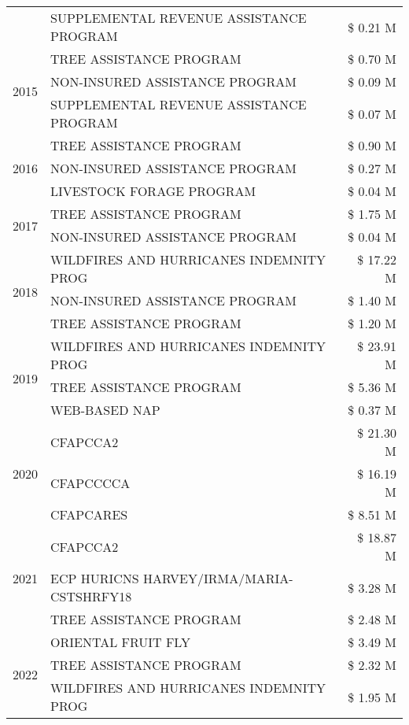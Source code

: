 \begin{tabular}{llr}
 & SUPPLEMENTAL REVENUE ASSISTANCE PROGRAM & \$ 0.21 M \\
\cline{1-3}
\multirow[t]{3}{*}{2015} & TREE ASSISTANCE PROGRAM & \$ 0.70 M \\
 & NON-INSURED ASSISTANCE PROGRAM & \$ 0.09 M \\
 & SUPPLEMENTAL REVENUE ASSISTANCE PROGRAM & \$ 0.07 M \\
\cline{1-3}
\multirow[t]{3}{*}{2016} & TREE ASSISTANCE PROGRAM & \$ 0.90 M \\
 & NON-INSURED ASSISTANCE PROGRAM & \$ 0.27 M \\
 & LIVESTOCK FORAGE PROGRAM & \$ 0.04 M \\
\cline{1-3}
\multirow[t]{2}{*}{2017} & TREE ASSISTANCE PROGRAM & \$ 1.75 M \\
 & NON-INSURED ASSISTANCE PROGRAM & \$ 0.04 M \\
\cline{1-3}
\multirow[t]{3}{*}{2018} & WILDFIRES AND HURRICANES INDEMNITY PROG & \$ 17.22 M \\
 & NON-INSURED ASSISTANCE PROGRAM & \$ 1.40 M \\
 & TREE ASSISTANCE PROGRAM & \$ 1.20 M \\
\cline{1-3}
\multirow[t]{3}{*}{2019} & WILDFIRES AND HURRICANES INDEMNITY PROG & \$ 23.91 M \\
 & TREE ASSISTANCE PROGRAM & \$ 5.36 M \\
 & WEB-BASED NAP & \$ 0.37 M \\
\cline{1-3}
\multirow[t]{3}{*}{2020} & CFAPCCA2 & \$ 21.30 M \\
 & CFAPCCCCA & \$ 16.19 M \\
 & CFAPCARES & \$ 8.51 M \\
\cline{1-3}
\multirow[t]{3}{*}{2021} & CFAPCCA2 & \$ 18.87 M \\
 & ECP HURICNS HARVEY/IRMA/MARIA-CSTSHRFY18 & \$ 3.28 M \\
 & TREE ASSISTANCE PROGRAM & \$ 2.48 M \\
\cline{1-3}
\multirow[t]{3}{*}{2022} & ORIENTAL FRUIT FLY & \$ 3.49 M \\
 & TREE ASSISTANCE PROGRAM & \$ 2.32 M \\
 & WILDFIRES AND HURRICANES INDEMNITY PROG & \$ 1.95 M \\
\cline{1-3}
\bottomrule
\end{tabular}
